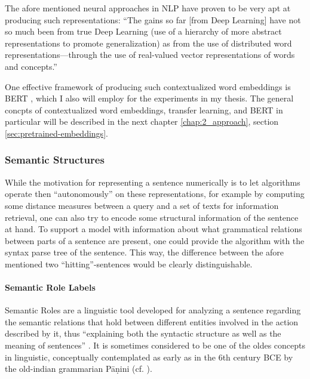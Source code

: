 The afore mentioned neural approaches in NLP have proven to be very apt at
producing such representations: ``The gains so far [from Deep Learning] have
not so much been from true Deep Learning (use of a hierarchy of more abstract
representations to promote generalization) as from the use of distributed word
representations—through the use of real-valued vector representations of words
and concepts.'' \citep[p.~703]{manning2015computational}


One effective framework of producing such contextualized word embeddings is BERT \citep{devlin2018bert},
which I also will employ for the experiments in my thesis. The general concpts of contextualized
word embeddings, transfer learning, and BERT in particular will be described in the next chapter
\ref{chap:2_approach}, section \ref{sec:pretrained-embeddings}.


\subsubsection*{Semantic Structures}

While the motivation for representing a sentence numerically is to let algorithms operate
then ``autonomously'' on these representations, for example by computing some distance measures
between a query and a set of texts for information retrieval, one can also try to encode
some structural information of the sentence at hand.
To support a model with information about what grammatical relations between
parts of a sentence are present, one could provide the algorithm with the syntax parse
tree of the sentence. This way, the difference between the afore mentioned
two ``hitting''-sentences would be clearly distinguishable.

\paragraph*{Semantic Role Labels}

Semantic Roles are a linguistic tool developed for analyzing a sentence regarding the
semantic relations that hold between different entities involved in the action described by
it, thus ``explaining both the syntactic structure as well as the meaning of sentences''
\cite{bussmann2006routledge}. It is sometimes considered to be one of the oldes concepts in
linguistic, conceptually contemplated as early as in the 6th century BCE by the old-indian
grammarian P\=a\d{n}ini (cf. \citep{gildea2002automatic}).

